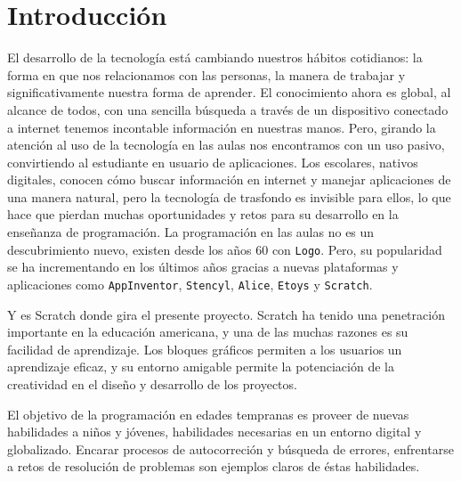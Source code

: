 \documentclass[a4paper, 12pt]{book}
\begin{document}
\cleardoublepage
\chapter{Introducción}
\label{sec:intro} %

El desarrollo de la tecnología está cambiando nuestros hábitos cotidianos: la forma
en que nos relacionamos con las personas, la manera de trabajar y significativamente
nuestra forma de aprender. El conocimiento ahora es global, al alcance de todos, con
una sencilla búsqueda a través de un dispositivo conectado a internet tenemos incontable
información en nuestras manos. Pero, girando la atención al uso de la tecnología en las 
aulas nos encontramos con un uso pasivo, convirtiendo al estudiante en usuario de 
aplicaciones. Los escolares, nativos digitales, conocen cómo buscar información en internet 
y manejar aplicaciones de una manera natural, pero la tecnología de trasfondo es invisible 
para ellos, lo que hace que pierdan muchas oportunidades y retos para su desarrollo en la
enseñanza de programación.
La programación en las aulas no es un descubrimiento nuevo, existen desde los años 60  con \texttt{Logo}. 
Pero, su popularidad se ha incrementando en los últimos años gracias a nuevas plataformas y aplicaciones
como \texttt{AppInventor}, \texttt{Stencyl}, \texttt{Alice}, \texttt{Etoys} y \texttt{Scratch}.

Y es Scratch donde gira el presente proyecto. Scratch ha tenido una penetración importante 
en la educación americana, y una de las muchas razones es su facilidad de aprendizaje. Los
bloques gráficos permiten a los usuarios un aprendizaje eficaz, y su entorno amigable permite 
la potenciación de la creatividad en el diseño y desarrollo de los proyectos.

El objetivo de la programación en edades tempranas es proveer de nuevas habilidades a niños y
jóvenes, habilidades necesarias en un entorno digital y globalizado. Encarar procesos de
autocorreción y búsqueda de errores, enfrentarse a retos de resolución de problemas son ejemplos
claros de éstas habilidades.







\end{document}
